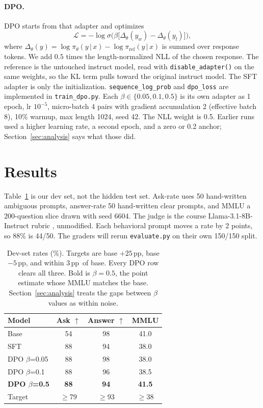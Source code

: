 \documentclass[11pt]{article}
\newcommand{\pp}{\,pp}
\begin{document}
\paragraph{DPO.}
DPO starts from that adapter and optimizes
\begin{equation}
\mathcal{L} = -\log\sigma\!\Big(\beta\big[\Delta_\theta(y_w) - \Delta_\theta(y_l)\big]\Big),
\label{eq:dpo}
\end{equation}
where $\Delta_\theta(y) = \log\pi_\theta(y\,|\,x) - \log\pi_{\mathrm{ref}}(y\,|\,x)$ is summed over response tokens.
We add $0.5$ times the length-normalized NLL of the chosen response.
The reference is the untouched instruct model, read with \texttt{disable\_adapter()} on the same weights, so the KL term pulls toward the original instruct model. The SFT adapter is only the initialization.
\texttt{sequence\_log\_prob} and \texttt{dpo\_loss} are implemented in \texttt{train\_dpo.py}.
Each $\beta \in \{0.05, 0.1, 0.5\}$ is its own adapter as 1 epoch, lr $10^{-5}$, micro-batch 4 pairs with gradient accumulation 2 (effective batch 8), 10\% warmup, max length 1024, seed 42.
The NLL weight is 0.5.
Earlier runs used a higher learning rate, a second epoch, and a zero or 0.2 anchor; Section~\ref{sec:analysis} says what those did.

\section{Results}
\label{sec:results}

Table~\ref{tab:main} is our dev set, not the hidden test set.
Ask-rate uses 50 hand-written ambiguous prompts, answer-rate 50 hand-written clear prompts, and MMLU a 200-question slice \citep{hendrycks2021mmlu} drawn with seed 6604.
The judge is the course Llama-3.1-8B-Instruct rubric \citep{zheng2023judging}, unmodified.
Each behavioral prompt moves a rate by 2 points, so 88\% is 44/50.
The graders will rerun \texttt{evaluate.py} on their own 150/150 split.

\begin{table}[t]
\centering
\small
\begin{tabular}{lccc}
\toprule
Model & Ask $\uparrow$ & Answer $\uparrow$ & MMLU \\
\midrule
Base             & 54 & 98 & 41.0 \\
SFT              & 88 & 94 & 38.0 \\
DPO $\beta$=0.05 & 88 & 98 & 38.0 \\
DPO $\beta$=0.1  & 88 & 96 & 38.5 \\
\textbf{DPO $\beta$=0.5} & \textbf{88} & \textbf{94} & \textbf{41.5} \\
\midrule
Target           & $\geq$79 & $\geq$93 & $\geq$38 \\
\bottomrule
\end{tabular}
\caption{Dev-set rates (\%). Targets are base $+25$\pp, base $-5$\pp, and within $3$\pp\ of base. Every DPO row clears all three. Bold is $\beta{=}0.5$, the point estimate whose MMLU matches the base. Section~\ref{sec:analysis} treats the gaps between $\beta$ values as within noise.}
\label{tab:main}
\end{table}
\end{document}
